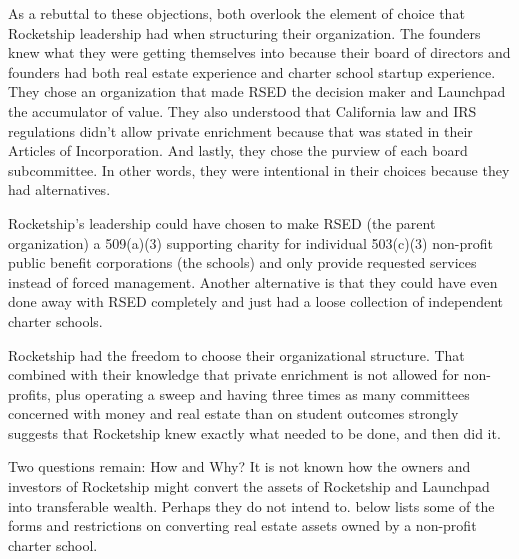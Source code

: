 As a rebuttal to these objections, both overlook the element of choice that Rocketship leadership had when structuring their organization. The founders knew what they were getting themselves into because their board of directors and founders had both real estate experience and charter school startup experience. They chose an organization that made RSED the decision maker and Launchpad the accumulator of value. They also understood that California law and IRS regulations didn't allow private enrichment because that was stated in their Articles of Incorporation. And lastly, they chose the purview of each board subcommittee. In other words, they were intentional in their choices because they had alternatives.

Rocketship's leadership could have chosen to make RSED (the parent organization) a 509(a)(3) supporting charity for individual 503(c)(3) non-profit public benefit corporations (the schools) and only provide requested services instead of forced management. Another alternative is that they could have even done away with RSED completely and just had a loose collection of independent charter schools. 

Rocketship had the freedom to choose their organizational structure. That combined with their knowledge that private enrichment is not allowed for non-profits, plus operating a sweep and having three times as many committees concerned with money and real estate than on student outcomes strongly suggests that Rocketship knew exactly what needed to be done, and then did it.

Two questions remain: How and Why? It is not known how the owners and investors of Rocketship might convert the assets of Rocketship and Launchpad into transferable wealth. Perhaps they do not intend to.  below lists some of the forms and restrictions on converting real estate assets owned by a non-profit charter school.

